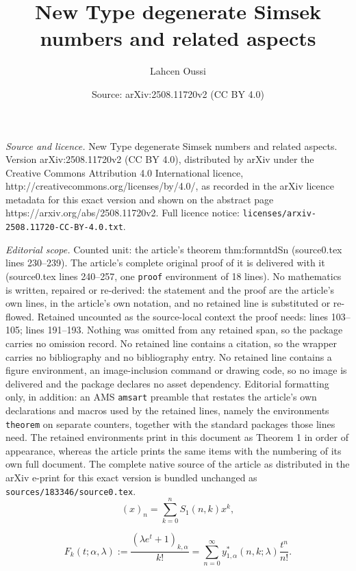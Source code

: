 \documentclass[10pt,a4paper]{amsart}
\title{New Type degenerate Simsek numbers and related aspects}
\author{Lahcen Oussi}
\date{Source: arXiv:2508.11720v2 (CC BY 4.0)}
\begin{document}
\maketitle

\noindent\emph{Source and licence.} New Type degenerate Simsek numbers and related aspects. Version arXiv:2508.11720v2 (CC BY 4.0), distributed by arXiv under the Creative Commons Attribution 4.0 International licence, http://creativecommons.org/licenses/by/4.0/, as recorded in the arXiv licence metadata for this exact version and shown on the abstract page https://arxiv.org/abs/2508.11720v2. Full licence notice: \texttt{licenses/arxiv-2508.11720-CC-BY-4.0.txt}.\par\smallskip

\noindent\textit{Editorial scope.} Counted unit: the article's theorem thm:formntdSn (source0.tex lines 230--239). The article's complete original proof of it is delivered with it (source0.tex lines 240--257, one \texttt{proof} environment of 18 lines). No mathematics is written, repaired or re-derived: the statement and the proof are the article's own lines, in the article's own notation, and no retained line is substituted or re-flowed.  Retained uncounted as the source-local context the proof needs: lines 103--105; lines 191--193.  Nothing was omitted from any retained span, so the package carries no omission record.  No retained line contains a citation, so the wrapper carries no bibliography and no bibliography entry.  No retained line contains a figure environment, an image-inclusion command or drawing code, so no image is delivered and the package declares no asset dependency.  Editorial formatting only, in addition: an AMS \texttt{amsart} preamble that restates the article's own declarations and macros used by the retained lines, namely the environments \texttt{theorem} on separate counters, together with the standard packages those lines need.  The retained environments print in this document as Theorem 1 in order of appearance, whereas the article prints the same items with the numbering of its own full document.  The complete native source of the article as distributed in the arXiv e-print for this exact version is bundled unchanged as \texttt{sources/183346/source0.tex}.
\begin{equation}\label{SNFK}
    (x)_n=\sum_{k=0}^{n}S_{1}(n,k)x^k,
\end{equation}

 \begin{equation}\label{newgSn}
F_{k}(t; \alpha, \lambda):=\frac{(\lambda e^t+1)_{k,\alpha}}{k!}=\sum_{n=0}^{\infty}y_{1,\alpha}^{*}(n,k;\lambda)\frac{t^n}{n!}.  
 \end{equation}
\end{document}
